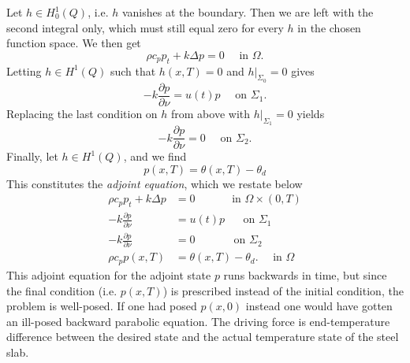 Let $h\in H_0^1(Q)$, i.e. $h$ vanishes at the boundary. Then we are left with the second integral only, which must still equal zero for every $h$ in the chosen function space. We then get
\begin{equation*}
  \rho c_p p_t + k\Delta p = 0 \quad\textrm{ in } \Omega.
\end{equation*}
Letting $h\in H^1(Q)$ such that $h(x, T) = 0$ and $h|_{\Sigma_0}=0$ gives
\begin{equation*}
  -k\frac{\partial p}{\partial\nu} = u(t)p \quad\textrm{ on } \Sigma_1.
\end{equation*}
Replacing the last condition on $h$ from above with $h|_{\Sigma_1}=0$ yields
\begin{equation*}
  -k\frac{\partial p}{\partial\nu} = 0 \quad\textrm{ on } \Sigma_2.
\end{equation*}
Finally, let $h\in H^1(Q)$, and we find
\begin{equation*}
  p(x, T) = \theta(x, T) - \theta_d
\end{equation*}
This constitutes the \textit{adjoint equation}, which we restate below
\begin{subequations}\label{eq:adjoint-system}
   \begin{align} %
      \rho c_p p_t + k\Delta p &= 0 \quad\qquad\textrm{ in } \Omega \times (0,T) \label{eq:adjoint-system-eqn} \\
      {-k}\frac{\partial p}{\partial\nu} &= u(t)p \,\,\quad\textrm{ on } \Sigma_1 \label{eq:adjoint-system-bd-1} \\
      {-k}\frac{\partial p}{\partial\nu} &= 0 \,\quad\qquad\textrm{ on } \Sigma_2 \label{eq:adjoint-system-bd-2} \\
      \rho c_p p(x, T) &= \theta(x, T) - \theta_d. \quad \textrm{ in } \Omega
   \end{align}
   \label{eq:adjoint-eqn}
\end{subequations}
This adjoint equation for the adjoint state $p$ runs backwards in time, but since the final condition (i.e. $p(x,T)$) is prescribed instead of the initial condition, the problem is well-posed. If one had posed $p(x, 0)$ instead one would have gotten an ill-posed backward parabolic equation. The driving force is end-temperature difference between the desired state and the actual temperature state of the steel slab.

